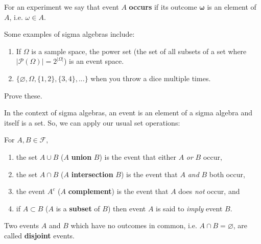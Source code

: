 For an experiment we say that event \(A\) \textbf{occurs} if its outcome \(\boldsymbol\omega\)
is an element of \(A\), i.e. \(\omega\in A\). 

\begin{example}
    Some examples of sigma algebras include:
    \begin{enumerate}
        \item If \(\Omega\) is a sample space, the power set (the set of all 
        subsets of a set where \(|\mathcal{P}(\Omega)|=2^{|\Omega|}\))
        is an event space.
        \item \(\{\varnothing, \Omega, \{1, 2\}, \{3, 4\}, ...\}\) when you throw a dice multiple times. 
    \end{enumerate}
\end{example}

\begin{exercise}
    Prove these.
\end{exercise}

In the context of sigma algebras, an event is an element of 
a sigma algebra and itself is a set. So, we can apply our usual set operations:

\bigskip
For \(A,B\in\mathcal{F},\)

\begin{enumerate}
    \item the set \(A\cup B\) (\(A\) \textbf{union} \(B\)) is the event that either \(A\) \textit{or} \(B\) occur,
    \item the set \(A\cap B\) (\(A\) \textbf{intersection} \(B\)) is the event that \(A\) \textit{and} \(B\) both occur,
    \item the event \(A^c\) (\(A\) \textbf{complement}) is the event that \(A\) does \textit{not} occur, and
    \item if \(A\subset B\) (\(A\) is a \textbf{subset} of \(B\)) then event \(A\) is said to \textit{imply} event \(B\).
\end{enumerate}

Two events \(A\) and \(B\) which have no outcomes in common, i.e. \(A\cap B=\varnothing\), 
are called \textbf{disjoint} events. 

\medskip




